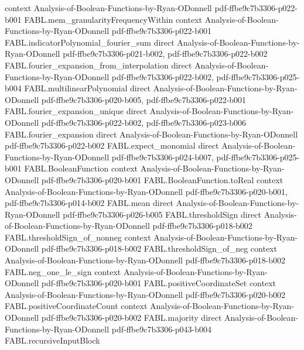 \begin{theorem}
  {context}
  {Analysis-of-Boolean-Functions-by-Ryan-ODonnell}
  {pdf-ffbe9c7b3306-p022-b001}
\proofstep
  {FABL.mem_granularityFrequencyWithin}
  {context}
  {Analysis-of-Boolean-Functions-by-Ryan-ODonnell}
  {pdf-ffbe9c7b3306-p022-b001}
\proofstep
  {FABL.indicatorPolynomial_fourier_sum}
  {direct}
  {Analysis-of-Boolean-Functions-by-Ryan-ODonnell}
  {pdf-ffbe9c7b3306-p021-b002,
    pdf-ffbe9c7b3306-p022-b002}
\proofstep
  {FABL.fourier_expansion_from_interpolation}
  {direct}
  {Analysis-of-Boolean-Functions-by-Ryan-ODonnell}
  {pdf-ffbe9c7b3306-p022-b002,
    pdf-ffbe9c7b3306-p025-b004}
\proofstep
  {FABL.multilinearPolynomial}
  {direct}
  {Analysis-of-Boolean-Functions-by-Ryan-ODonnell}
  {pdf-ffbe9c7b3306-p020-b005,
    pdf-ffbe9c7b3306-p022-b001}
\proofstep
  {FABL.fourier_expansion_unique}
  {direct}
  {Analysis-of-Boolean-Functions-by-Ryan-ODonnell}
  {pdf-ffbe9c7b3306-p022-b002,
    pdf-ffbe9c7b3306-p023-b006}
\proofstep
  {FABL.fourier_expansion}
  {direct}
  {Analysis-of-Boolean-Functions-by-Ryan-ODonnell}
  {pdf-ffbe9c7b3306-p022-b002}
\proofstep
  {FABL.expect_monomial}
  {direct}
  {Analysis-of-Boolean-Functions-by-Ryan-ODonnell}
  {pdf-ffbe9c7b3306-p024-b007,
    pdf-ffbe9c7b3306-p025-b001}
\proofstep
  {FABL.BooleanFunction}
  {context}
  {Analysis-of-Boolean-Functions-by-Ryan-ODonnell}
  {pdf-ffbe9c7b3306-p020-b001}
\proofstep
  {FABL.BooleanFunction.toReal}
  {context}
  {Analysis-of-Boolean-Functions-by-Ryan-ODonnell}
  {pdf-ffbe9c7b3306-p020-b001,
    pdf-ffbe9c7b3306-p014-b002}
\proofstep
  {FABL.mean}
  {direct}
  {Analysis-of-Boolean-Functions-by-Ryan-ODonnell}
  {pdf-ffbe9c7b3306-p026-b005}
\proofstep
  {FABL.thresholdSign}
  {direct}
  {Analysis-of-Boolean-Functions-by-Ryan-ODonnell}
  {pdf-ffbe9c7b3306-p018-b002}
\proofstep
  {FABL.thresholdSign_of_nonneg}
  {context}
  {Analysis-of-Boolean-Functions-by-Ryan-ODonnell}
  {pdf-ffbe9c7b3306-p018-b002}
\proofstep
  {FABL.thresholdSign_of_neg}
  {context}
  {Analysis-of-Boolean-Functions-by-Ryan-ODonnell}
  {pdf-ffbe9c7b3306-p018-b002}
\proofstep
  {FABL.neg_one_le_sign}
  {context}
  {Analysis-of-Boolean-Functions-by-Ryan-ODonnell}
  {pdf-ffbe9c7b3306-p020-b001}
\proofstep
  {FABL.positiveCoordinateSet}
  {context}
  {Analysis-of-Boolean-Functions-by-Ryan-ODonnell}
  {pdf-ffbe9c7b3306-p020-b002}
\proofstep
  {FABL.positiveCoordinateCount}
  {context}
  {Analysis-of-Boolean-Functions-by-Ryan-ODonnell}
  {pdf-ffbe9c7b3306-p020-b002}
\proofstep
  {FABL.majority}
  {direct}
  {Analysis-of-Boolean-Functions-by-Ryan-ODonnell}
  {pdf-ffbe9c7b3306-p043-b004}
\proofstep
  {FABL.recursiveInputBlock}

\end{theorem}

